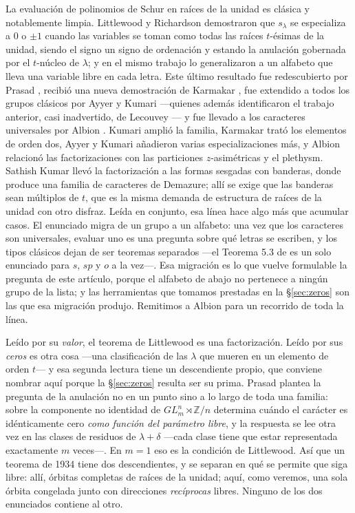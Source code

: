 \documentclass[11pt,reqno]{amsart}
\theoremstyle{plain}
\theoremstyle{definition}
\newcommand{\ZZ}{\mathbb{Z}}
\begin{document}
La evaluación de polinomios de Schur en raíces de la unidad es clásica y notablemente limpia.
Littlewood y Richardson \cite{LR34} demostraron que $s_\lambda$ se especializa a $0$ o $\pm1$ cuando
las variables se toman como todas las raíces $t$-ésimas de la unidad, siendo el signo un signo de
ordenación y estando la anulación gobernada por el $t$-núcleo de $\lambda$; y en el mismo trabajo lo
generalizaron a un alfabeto que lleva una variable libre en cada letra. Este último resultado fue
redescubierto por Prasad \cite{Pra16}, recibió una nueva demostración de Karmakar \cite{Kar22}, fue
extendido a todos los grupos clásicos por Ayyer y Kumari \cite{AK22} ---quienes además identificaron
el trabajo anterior, casi inadvertido, de Lecouvey \cite{Lec09}--- y fue llevado a los caracteres
universales por Albion \cite{Alb23}. Kumari \cite{Kum24} amplió la familia, Karmakar \cite{Kar24}
trató los elementos de orden dos, Ayyer y Kumari \cite{AK25} añadieron varias especializaciones más,
y Albion \cite{Alb25} relacionó las factorizaciones con las particiones $z$-asimétricas y el
plethysm. Sathish Kumar \cite{SK23} llevó la factorización a las formas sesgadas con
banderas, donde produce una familia de caracteres de Demazure; allí se exige que las banderas
sean múltiplos de $t$, que es la misma demanda de estructura de raíces de la unidad con otro
disfraz. Leída en conjunto, esa línea hace algo más que acumular casos. El enunciado migra de un
grupo a un alfabeto: una vez que los caracteres son universales, evaluar uno es una pregunta sobre
qué letras se escriben, y los tipos clásicos dejan de ser teoremas separados ---el Teorema 5.3 de
\cite{AK25} es un solo enunciado para $s$, $sp$ y $o$ a la vez---. Esa migración es lo que vuelve
formulable la pregunta de este artículo, porque el alfabeto de abajo no pertenece a ningún grupo de
la lista; y las herramientas que tomamos prestadas en la \S\ref{sec:zeros} son las que esa migración
produjo. Remitimos a Albion \cite{Alb23} para un recorrido de toda la línea.

Leído por su \emph{valor}, el teorema de Littlewood es una factorización. Leído por sus \emph{ceros}
es otra cosa ---una clasificación de las $\lambda$ que mueren en un elemento de orden $t$--- y esa
segunda lectura tiene un descendiente propio, que conviene nombrar aquí porque la
\S\ref{sec:zeros} resulta ser su prima. Prasad \cite[Teorema 2]{Pra16} plantea la pregunta de la
anulación no en un punto sino a lo largo de toda una familia: sobre la componente no identidad de
$GL_m^n\rtimes\ZZ/n$ determina cuándo el carácter es idénticamente cero \emph{como función del
parámetro libre}, y la respuesta se lee otra vez en las clases de residuos de $\lambda+\delta$
---cada clase tiene que estar representada exactamente $m$ veces---. En $m=1$ eso es la condición de
Littlewood. Así que un teorema de 1934 tiene dos descendientes, y se separan en qué se permite
que siga libre: allí, órbitas completas de raíces de la unidad; aquí, como veremos, una sola órbita
congelada junto con direcciones \emph{recíprocas} libres. Ninguno de los dos enunciados contiene al
otro.
\end{document}
